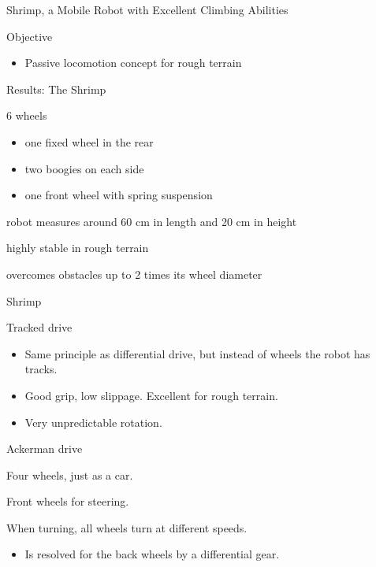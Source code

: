 \documentclass[compress]{beamer}
\begin{document}
\begin{frame}{Shrimp, a Mobile Robot with Excellent Climbing Abilities}

Objective

\begin{itemize}
    \item Passive locomotion concept for rough terrain
\end{itemize}

Results: The Shrimp

6 wheels

\begin{itemize}
    \item one fixed wheel in the rear
    \item two boogies on each side
    \item one front wheel with spring suspension
\end{itemize}

robot measures around 60 cm in length and 20 cm in height

highly stable in rough terrain

overcomes obstacles up to 2 times its wheel diameter

\end{frame}

\begin{frame}{Shrimp}

\end{frame}

\begin{frame}{Tracked drive}

\begin{itemize}
    \item Same principle as differential drive, but instead of wheels the robot
  has tracks.
    \item Good grip, low slippage. Excellent for rough terrain.
    \item Very unpredictable rotation.
\end{itemize}

\end{frame}

\begin{frame}{Ackerman drive}

Four wheels, just as a car.

Front wheels for steering.

When turning, all wheels turn at different speeds.

\begin{itemize}
    \item Is resolved for the back wheels by a differential gear.
\end{itemize}

\end{frame}
\end{document}
